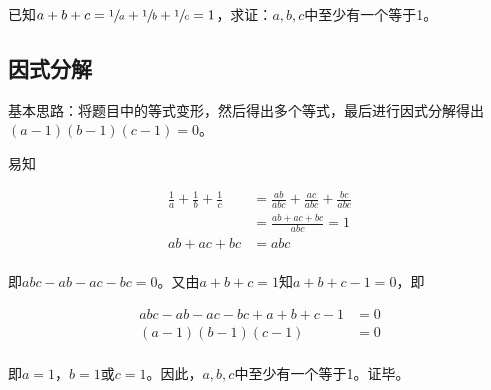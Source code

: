 

已知$a + b + c = \sfrac1a + \sfrac1b + \sfrac1c = 1$，求证：$a, b, c$中至少有一个等于1。

\subsection{因式分解}

基本思路：将题目中的等式变形，然后得出多个等式，最后进行因式分解得出$(a - 1)(b - 1)(c - 1) = 0$。

易知

\begin{align*}
  \frac1a + \frac1b + \frac1c &= \frac{ab}{abc} + \frac{ac}{abc} + \frac{bc}{abc} \\
  &= \frac{ab + ac + bc}{abc} = 1 \\
  ab + ac + bc &= abc \\
\end{align*}

即$abc - ab - ac - bc = 0$。又由$a + b + c = 1$知$a + b + c - 1 = 0$，即

\begin{align*}
  abc - ab - ac - bc + a + b + c - 1 &= 0 \\
  (a - 1)(b - 1)(c - 1) &= 0 \\
\end{align*}

即$a = 1$，$b = 1$或$c = 1$。因此，$a, b, c$中至少有一个等于1。证毕。
